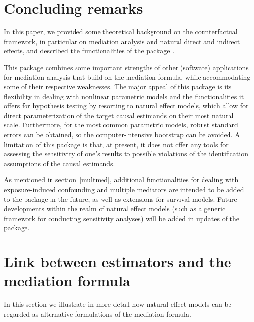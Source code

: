 \documentclass[nojss]{jss}
\begin{document}
\section[Concluding remarks]{Concluding remarks}\label{concl}
In this paper, we provided some theoretical background on the counterfactual framework, in particular on mediation analysis and natural direct and indirect effects, and described the functionalities of the  package . 
\par This package combines some important strengths of other (software) applications for mediation analysis that build on the mediation formula, while accommodating some of their respective weaknesses. The major appeal of this package is its flexibility in dealing with nonlinear parametric models and the functionalities it offers for hypothesis testing by resorting to natural effect models, which allow for direct parameterization of the target causal estimands on their most natural scale. Furthermore, for the most common parametric models, robust standard errors can be obtained, so the computer-intensive bootstrap can be avoided. A limitation of this package is that, at present, it does not offer any tools for assessing the sensitivity of one's results to possible violations of the identification assumptions of the causal estimands.
\par As mentioned in section~\ref{multmed}, additional functionalities for dealing with exposure-induced confounding and multiple mediators are intended to be added to the package in the future, as well as extensions for survival models. Future developments within the realm of natural effect models (such as a generic framework for conducting sensitivity analyses) will be added in updates of the package.

\appendix

\section[]{Link between estimators and the mediation formula}
In this section we illustrate in more detail how natural effect models can be regarded as alternative formulations of the mediation formula.
\end{document}
